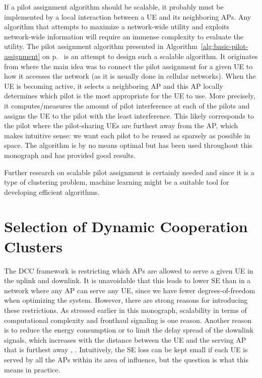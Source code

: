 If a pilot assignment algorithm should be scalable, it probably must be implemented by a local interaction between a UE and its neighboring APs. Any algorithm that attempts to maximize a network-wide utility and exploits network-wide information will require an immense complexity to evaluate the utility. The pilot assignment algorithm presented in Algorithm~\ref{alg:basic-pilot-assignment} on p.~\pageref{alg:basic-pilot-assignment} is an attempt to design such a scalable algorithm. It originates from \cite{Bjornson2020a} where the main idea was to connect the pilot assignment for a given UE to how it accesses the network (as it is usually done in cellular networks). When the UE is becoming active, it selects a neighboring AP and this AP locally determines which pilot is the most appropriate for the UE to use. More precisely, it computes/measures the amount of pilot interference at each of the pilots and assigns the UE to the pilot with the least interference. This likely corresponds to the pilot where the pilot-sharing UEs are furthest away from the AP, which makes intuitive sense: we want each pilot to be reused as sparsely as possible in space. The algorithm is by no means optimal but has been used throughout this monograph and has provided  good results.

Further research on scalable pilot assignment is certainly needed and since it is a type of clustering problem, machine learning might be a suitable tool for developing efficient algorithms.



\section{Selection of Dynamic Cooperation Clusters}
\label{sec:selecting-DCC-advanced}


The DCC framework is restricting which APs are allowed to serve a given UE in the uplink and downlink. It is unavoidable that this leads to lower SE than in a network where any AP can serve any UE, since we have fewer degrees-of-freedom when optimizing the system. However, there are  strong reasons for introducing these restrictions. As stressed earlier in this monograph, scalability in terms of computational complexity and fronthaul signaling is one reason.
Another reason is to reduce the energy consumption \cite{Ngo2018a} or to limit the delay spread of the downlink signals, which increases with the distance between the UE and the serving AP that is furthest away \cite{Bjornson2013d}, \cite{Zhang2008a}. Intuitively, the SE loss can be kept small if each UE is served by all the APs within its area of influence, but the question is what this means in practice.

